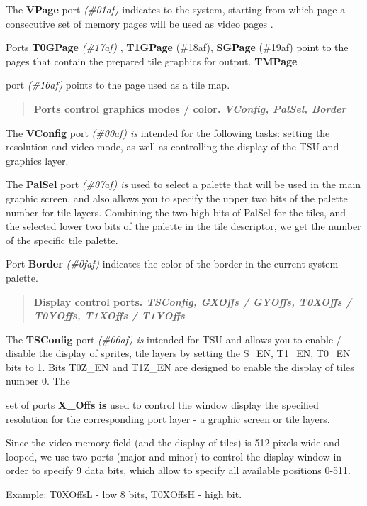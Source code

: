 \documentclass{article}
\begin{document}
The \textbf{VPage} port \emph{(\#01af)} indicates to the system,
starting from which page a consecutive set of memory pages will be
used as video pages .

Ports \textbf{T0GPage } \emph{(\#17af)} , \textbf{T1GPage} (\#18af),
\textbf{SGPage} (\#19af) point to the pages that contain the prepared
tile graphics for output. \textbf{TMPage}

port \emph{(\#16af)} points to the page used as a tile map.\textbf{}
\emph{}

\begin{quotation}
  \textbf{Ports control graphics modes / color. \emph{VConfig, PalSel,
      Border}}
\end{quotation}
The \textbf{VConfig} port \emph{(\#00af) is} intended for the
following tasks: setting the resolution and video mode, as well as
controlling the display of the TSU and graphics layer.

The \textbf{PalSel} port \emph{(\#07af) is} used to select a palette
that will be used in the main graphic screen, and also allows you to
specify the upper two bits of the palette number for tile
layers. Combining the two high bits of PalSel for the tiles, and the
selected lower two bits of the palette in the tile descriptor, we get
the number of the specific tile palette.

Port \textbf{Border } \emph{(\#0faf)} indicates the color of the
border in the current system palette.

\begin{quotation}
  \textbf{Display control ports. \emph{TSConfig, GXOffs / GYOffs,
      T0XOffs / T0YOffs, T1XOffs / T1YOffs}}
\end{quotation}
The \textbf{TSConfig} port \emph{(\#06af) is} intended for TSU and
allows you to enable / disable the display of sprites, tile layers by
setting the S\_EN, T1\_EN, T0\_EN bits to 1. Bits T0Z\_EN and T1Z\_EN
are designed to enable the display of tiles number 0. The

set of ports \textbf{X\_Offs is} used to control the window display
the specified resolution for the corresponding port layer - a graphic
screen or tile layers.

Since the video memory field (and the display of tiles) is 512 pixels
wide and looped, we use two ports (major and minor) to control the
display window in order to specify 9 data bits, which allow to specify
all available positions 0-511.

Example: T0XOffsL - low 8 bits, T0XOffsH - high bit.
\end{document}
